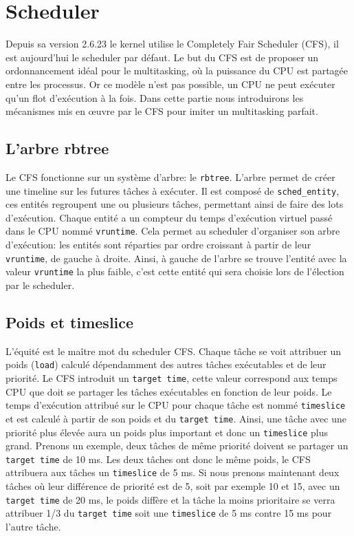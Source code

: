 \section{Scheduler}

Depuis sa version 2.6.23 le kernel utilise le Completely Fair Scheduler (CFS),
il est aujourd'hui le scheduler par défaut. Le but du CFS est de proposer un ordonnancement
idéal pour le multitasking, où la puissance du CPU est partagée entre les processus.
Or ce modèle n'est pas possible, un CPU ne peut exécuter qu'un flot d'exécution à la
fois. Dans cette partie nous introduirons les mécanismes mis en œuvre par le CFS pour
imiter un multitasking parfait. 

\subsection{L'arbre rbtree}
Le CFS fonctionne sur un système d'arbre: le \verb|rbtree|. L'arbre permet de
créer une timeline sur les futures tâches à exécuter.
Il est composé de \verb|sched_entity|, ces entités regroupent une ou plusieurs
tâches, permettant ainsi de faire des lots d'exécution. Chaque entité a un compteur
du temps d'exécution virtuel passé dans le
CPU nommé \verb|vruntime|. Cela permet au scheduler d'organiser son
arbre d'exécution: les entités sont réparties par ordre croissant à partir de
leur \verb|vruntime|, de gauche à droite. Ainsi, à gauche de l'arbre se trouve
l'entité avec la valeur \verb|vruntime| la plus faible, c'est cette entité qui
sera choisie lors de l'élection par le scheduler.

\subsection{Poids et timeslice}
L'équité est le maître mot du scheduler CFS. Chaque tâche se voit attribuer un poids
(\verb|load|) calculé dépendamment des autres tâches exécutables et de leur priorité.
Le CFS introduit un \verb|target time|, cette valeur correspond aux temps CPU que doit se partager
les tâches exécutables en fonction de leur poids. Le temps d'exécution attribué sur le CPU pour 
chaque tâche est nommé \verb|timeslice| et est calculé à partir de son poids et 
du \verb|target time|. Ainsi, une tâche avec une priorité plus élevée aura un poids 
plus important et donc un \verb|timeslice| plus grand.
Prenons un exemple, deux tâches de  même priorité doivent se partager un 
\verb|target time| de 10 ms. Les deux tâches ont donc le même poids, le CFS attribuera 
aux tâches un \verb|timeslice| de 5 ms. Si nous prenons 
maintenant deux tâches où leur différence de priorité est de 5, soit par 
exemple 10 et 15, avec un \verb|target time| de 20 ms, le poids diffère et la 
tâche la moins prioritaire se verra attribuer 1/3 du \verb|target time| soit 
une \verb|timeslice| de 5 ms contre 15 ms pour l'autre tâche.

